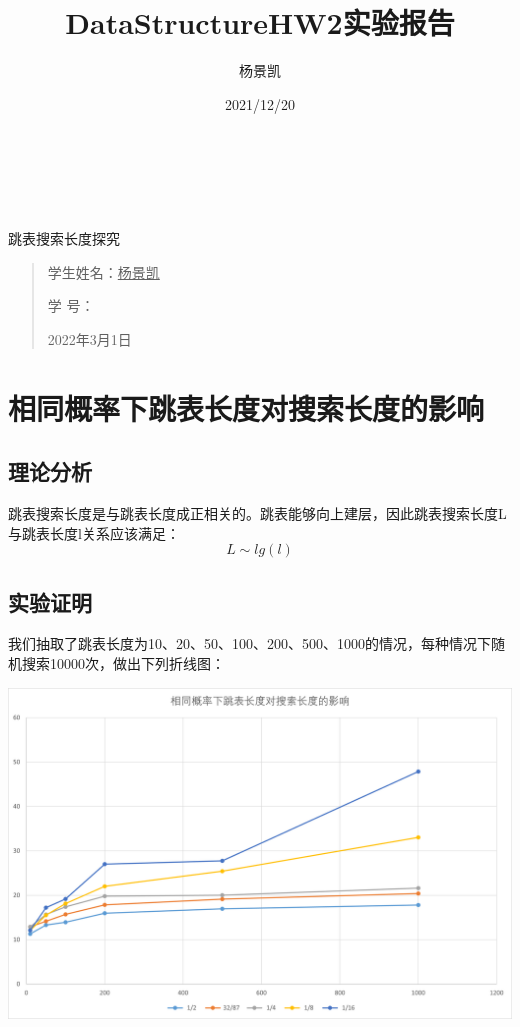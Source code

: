 \documentclass[UTF8]{ctexart}
\date{}
\title{DataStructureHW2实验报告}
\author{杨景凯}
\date{2021/12/20}
\begin{document}
 
\begin{center}
    \quad \\
    \quad \\
    \quad \\
    \vskip 3.5cm
    \heiti {} 跳表搜索长度探究\\
\end{center}
\vskip 3.5cm
\begin{quotation}
    \songti \fontsize{30}{30}
    \doublespacing
    \par\setlength\parindent{12em}
    \quad 
\begin{center}

    学生姓名：\underline{\qquad    \quad \quad 杨景凯    \quad  \quad\qquad }

    学\hspace{0.61cm} 号：\underline{\quad \quad{}\quad\quad}

\end{center}
    
    \centering
    2022年3月1日
\end{quotation}
\clearpage
\tableofcontents
\clearpage
\section{相同概率下跳表长度对搜索长度的影响}
\subsection{理论分析}
跳表搜索长度是与跳表长度成正相关的。跳表能够向上建层，因此跳表搜索长度L与跳表长度l关系应该满足：
$$L\sim lg(l)$$
\subsection{实验证明}
我们抽取了跳表长度为10、20、50、100、200、500、1000的情况，每种情况下随机搜索10000次，做出下列折线图：
\begin{center}
    \includegraphics[scale=0.6]{Length.png}
\end{center}
\end{document}
